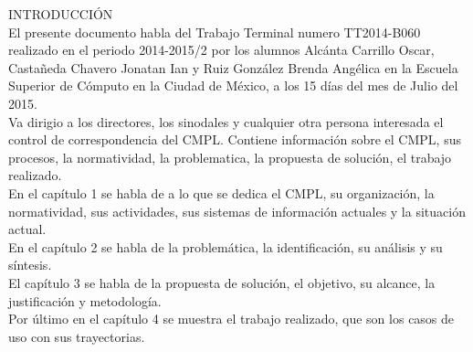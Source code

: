 INTRODUCCIÓN \\

El presente documento habla del Trabajo Terminal numero TT2014-B060 realizado en el periodo 2014-2015/2 por los alumnos Alcánta Carrillo Oscar, Castañeda Chavero Jonatan Ian y Ruiz González Brenda Angélica en la Escuela Superior de Cómputo en la Ciudad de México, a los 15 días del mes de Julio del 2015.\\

Va dirigio a los directores, los sinodales y cualquier otra persona interesada el control de correspondencia del CMPL. Contiene información sobre el CMPL, sus procesos, la normatividad, la problematica, la propuesta de solución, el trabajo realizado. \\

En el capítulo 1 se habla de a lo que se dedica el CMPL, su organización, la normatividad, sus actividades, sus sistemas de información actuales y la situación actual.\\
En el capítulo 2 se habla de la problemática, la identificación, su análisis y su síntesis. \\

El capítulo 3 se habla de la propuesta de solución, el objetivo, su alcance, la justificación y metodología.\\

Por último en el capítulo 4 se muestra el trabajo realizado, que son los casos de uso con sus trayectorias.\\